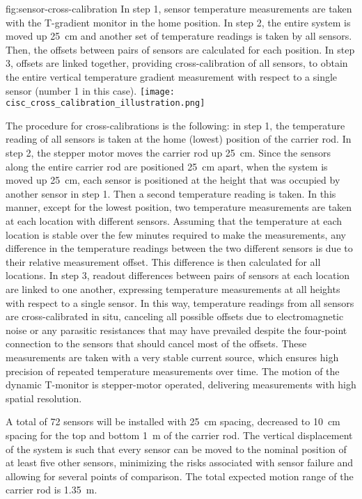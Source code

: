 \begin{dunefigure}{fig:sensor-cross-calibration}
  {In step 1, sensor temperature measurements are taken with the T-gradient monitor in the home position. In step 2, the entire system is moved up \SI{25}{cm} and another set of temperature readings is taken by all sensors. Then, the offsets between pairs of sensors are calculated for each position. In step 3, offsets are linked together, providing cross-calibration of all sensors, to obtain the entire vertical temperature gradient measurement with respect to a single sensor (number 1 in this case). }
  \texttt{[image: cisc\_cross\_calibration\_illustration.png]}%
\end{dunefigure}

The procedure for cross-calibrations is the following: in step 1, the temperature reading  of all sensors is taken at the home (lowest) position of the carrier rod. In  step 2, the stepper motor moves the carrier rod up \SI{25}{cm}. Since the sensors along the entire  carrier rod are positioned \SI{25}{cm} apart, when the system is moved up \SI{25}{cm}, each sensor is positioned at the height that was occupied by another sensor in step 1. Then a second temperature reading is taken. In this manner, except for the lowest position, two temperature measurements are taken at each location with %
different sensors. Assuming that the temperature at each location is stable over the few minutes required to make the measurements, %
any difference in the temperature readings between the two different sensors is due to their relative measurement offset. This %
difference is then calculated for all locations.  In step 3, readout differences between pairs of sensors at each location are linked to one another, expressing temperature measurements at all heights with respect to a single sensor. In this way, temperature readings from all sensors are cross-calibrated %
in situ, canceling all possible offsets due to electromagnetic noise or any parasitic resistances that may have prevailed despite the four-point connection to the sensors that should cancel most of the offsets. These measurements are taken with a very stable current source, which ensures high precision of repeated temperature measurements over time. The motion of the dynamic T-monitor is stepper-motor operated, delivering measurements with high spatial resolution. 


A total of \num{72} sensors will be installed with \SI{25}{cm} spacing, decreased to \SI{10}{cm} spacing for the top and bottom \SI{1}{m} of the carrier rod.  
 The vertical displacement of the system is such that every sensor can be moved to the nominal position of at least five other sensors, minimizing the risks associated with sensor failure and allowing for several points of comparison. The total expected motion range of the carrier rod is \SI{1.35}{m}.



